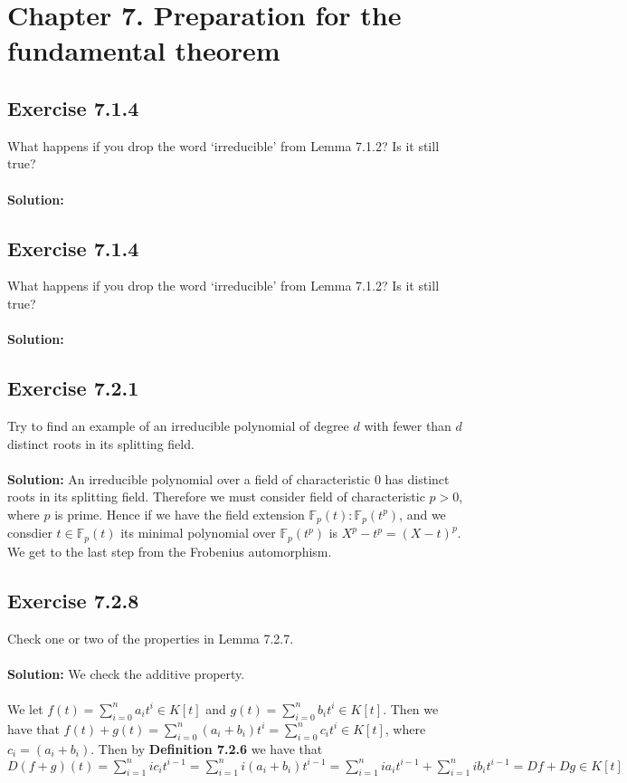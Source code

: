 \documentclass{article}
\begin{document}
\section*{Chapter 7. Preparation for the fundamental theorem}
\subsection*{Exercise 7.1.4}
What happens if you drop the word ‘irreducible’ from
Lemma 7.1.2? Is it still true?
\\\\
\textbf{Solution:}

\subsection*{Exercise 7.1.4}
What happens if you drop the word ‘irreducible’ from
Lemma 7.1.2? Is it still true?
\\\\
\textbf{Solution:}

\subsection*{Exercise 7.2.1}
Try to find an example of an irreducible polynomial
of degree $d$ with fewer than $d$ distinct roots in its splitting field.
\\\\
\textbf{Solution:}
An irreducible polynomial over a field of characteristic 0 has distinct roots in its splitting field.
Therefore we must consider field of characteristic $p >0$, where $p$ is prime. Hence if we have the field extension $\mathbb{F}_p(t):\mathbb{F}_p(t^p)$,
and we consdier $t \in \mathbb{F}_p(t)$ its minimal polynomial over $\mathbb{F}_p(t^p)$ is $X^p -t^p = (X-t)^p$. We get to the last step from the Frobenius automorphism.

\subsection*{Exercise 7.2.8}
Check one or two of the properties in Lemma 7.2.7.
\\\\
\textbf{Solution:}
We check the additive property.\\\\
We let $f(t) = \sum_{i=0}^{n} a_it^i \in K[t]$ and $ g(t) = \sum_{i=0}^{n} b_it^i \in K[t]$.
Then we have that $f(t)+g(t) = \sum_{i=0}^{n} (a_i+b_i)t^i = \sum_{i=0}^{n} c_it^i \in K[t]$, where
$c_i = (a_i+b_i)$. Then by \textbf{Definition 7.2.6} we have that $D(f+g)(t) = \sum_{i=1}^{n} ic_it^{i-1} = \sum_{i=1}^{n}i(a_i+b_i)t^{i-1} = \sum_{i=1}^{n} ia_it^{i-1} + \sum_{i=1}^{n} ib_it^{i-1} = Df + Dg \in K[t]$
\end{document}
